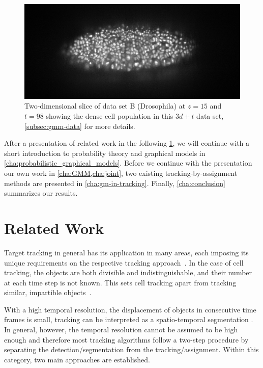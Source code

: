 \begin{figure}
    \centering
    \includegraphics[width=\textwidth]{images/gmm/data/B/300-399_z30_raw_0097_0014.png}
    \caption[Two-dimensional slice of data set B]{Two-dimensional slice of data set B (Drosophila)
        at $z=15$ and $t=98$ showing the dense cell population in this $3d+t$ data set, \cf
        \cref{subsec:gmm-data} for more details.}
    \label{fig:gmm-data-b-dense-population}
\end{figure}

After a presentation of related work in the following \cref{sec:related}, we will continue with a
short introduction to probability theory and graphical models in \cref{cha:probabilistic_graphical_models}. Before we
continue with the presentation our own work in \cref{cha:GMM,cha:joint}, two existing
tracking-by-assignment methods are presented in \cref{cha:gm-in-tracking}. Finally,
\cref{cha:conclusion} summarizes our results.



\section{Related Work}
\label{sec:related}
Target tracking in general has its application in many areas, each imposing its unique requirements
on the respective tracking approach~\citep{yilmaz_06_object}. In the case of cell tracking, the
objects are both divisible and indistinguishable, and their number at each time step is not
known. This sets cell tracking apart from tracking similar, impartible
objects~\citep{smal_08_multiple}.

With a high temporal resolution, \ie the displacement of objects in consecutive time frames is small,
tracking can be interpreted as a spatio-temporal segmentation
\citep{melani_07_cells,padfield_09_spatio,dzyubachyk_10_advanced}. In general, however, the temporal
resolution cannot be assumed to be high enough and therefore most tracking algorithms follow a
two-step procedure by separating the detection/segmentation from the tracking/assignment. Within
this category, two main approaches are established.

